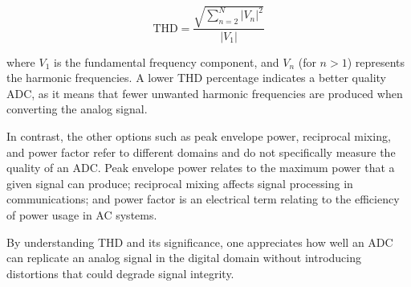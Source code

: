 \[
\text{THD} = \frac{\sqrt{ \sum_{n=2}^{N} |V_n|^2 }}{|V_1|}
\]

where \(V_1\) is the fundamental frequency component, and \(V_n\) (for \(n > 1\)) represents the harmonic frequencies. A lower THD percentage indicates a better quality ADC, as it means that fewer unwanted harmonic frequencies are produced when converting the analog signal.

In contrast, the other options such as peak envelope power, reciprocal mixing, and power factor refer to different domains and do not specifically measure the quality of an ADC. Peak envelope power relates to the maximum power that a given signal can produce; reciprocal mixing affects signal processing in communications; and power factor is an electrical term relating to the efficiency of power usage in AC systems.

By understanding THD and its significance, one appreciates how well an ADC can replicate an analog signal in the digital domain without introducing distortions that could degrade signal integrity.

